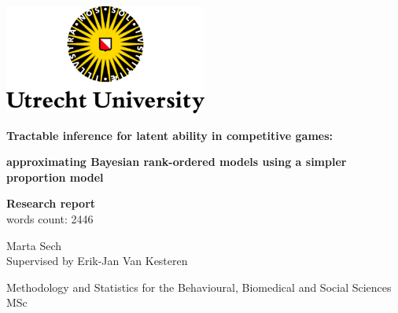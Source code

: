 \begin{titlepage}
   \begin{center}

   \vspace*{1cm}

   \includegraphics[width=0.5\textwidth]{images/UU_logo.png}
     \vspace{2cm}

     \Huge
     \textbf{Tractable inference for latent ability in competitive games:}

     \vspace{0.5cm}
     \Large
      \textbf{approximating Bayesian rank-ordered models using a simpler proportion model}
     
     \vspace{1.5cm}
     \Large
     \textbf{Research report}\\
     \large
     words count: 2446

     \vfill
     Marta Sech\\
     Supervised by Erik-Jan Van Kesteren

     \vspace{1cm}

    \Large
     Methodology and Statistics for the Behavioural, Biomedical and Social Sciences MSc\\

      \vspace{1cm}


     

   


   \end{center}
\end{titlepage}